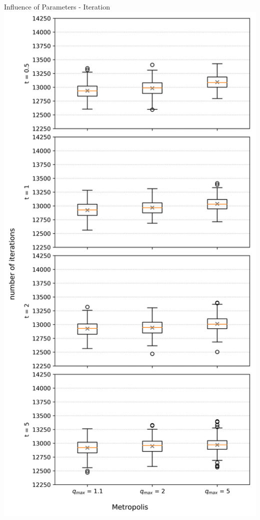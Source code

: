 \documentclass[]{beamer}
\begin{document}
  \begin{frame}{Influence of Parameters - Iteration}
    \centering
    \includegraphics[scale=0.25]{figs/results/params/iterations_metropolis.png}

\end{frame}
\end{document}
